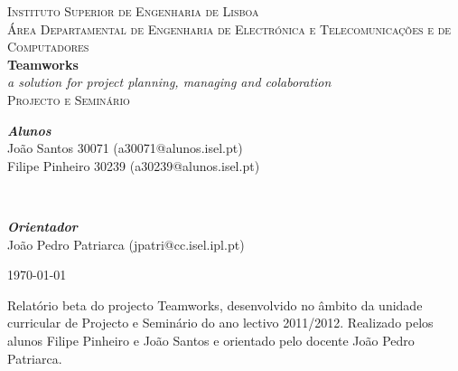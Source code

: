 ﻿\pagestyle{empty}

\begin{titlepage}
\begin{center}
\textsc{\large Instituto Superior de Engenharia de Lisboa}\\[0.4cm]
\textsc{\large Área Departamental de Engenharia de Electrónica e Telecomunicações e de Computadores }\\[4cm]
{ \Huge \bfseries Teamworks}\\[1cm]
{ \Large \emph{a solution for project planning, managing and colaboration} }\\[1cm]
\textsc{\large Projecto e Seminário}\\[3cm]
\begin{minipage}{1\textwidth}
\begin{flushleft} \large
\textbf{\emph{Alunos}}\\
João Santos 30071 (a30071@alunos.isel.pt) \\
Filipe Pinheiro 30239 (a30239@alunos.isel.pt)
\end{flushleft}
\end{minipage}\\[0.5cm]
\begin{minipage}{1\textwidth}
\begin{flushright} \large
\textbf{\emph{Orientador}}\\
João Pedro Patriarca (jpatri@cc.isel.ipl.pt)
\end{flushright}
\end{minipage}
\vfill
{\Large \today}
\end{center}
\end{titlepage}
\cleardoublepage

\vspace*{15cm}
\large{Relatório beta do projecto Teamworks, desenvolvido no âmbito da unidade curricular de Projecto e Seminário do ano lectivo 2011/2012. Realizado pelos alunos Filipe Pinheiro e João Santos e orientado pelo docente João Pedro Patriarca.}\\
\cleardoublepage

\pagestyle{plain}